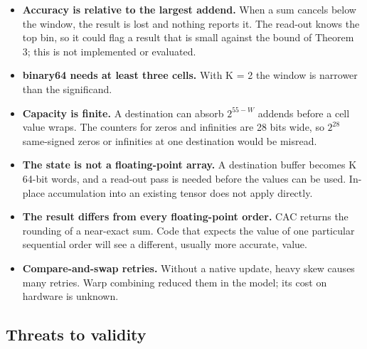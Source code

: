 \documentclass[journal]{IEEEtran}
\begin{document}
\begin{itemize}
\item
  \textbf{Accuracy is relative to the largest addend.} When a sum
  cancels below the window, the result is lost and nothing reports it.
  The read-out knows the top bin, so it could flag a result that is
  small against the bound of Theorem 3; this is not implemented or
  evaluated.
\item
  \textbf{binary64 needs at least three cells.} With K = 2 the window is
  narrower than the significand.
\item
  \textbf{Capacity is finite.} A destination can absorb \(2^{55−W}\)
  addends before a cell value wraps. The counters for zeros and
  infinities are 28 bits wide, so \(2^{28}\) same-signed zeros or
  infinities at one destination would be misread.
\item
  \textbf{The state is not a floating-point array.} A destination buffer
  becomes K 64-bit words, and a read-out pass is needed before the
  values can be used. In-place accumulation into an existing tensor does
  not apply directly.
\item
  \textbf{The result differs from every floating-point order.} CAC
  returns the rounding of a near-exact sum. Code that expects the value
  of one particular sequential order will see a different, usually more
  accurate, value.
\item
  \textbf{Compare-and-swap retries.} Without a native update, heavy skew
  causes many retries. Warp combining reduced them in the model; its
  cost on hardware is unknown.
\end{itemize}

\hypertarget{threats-to-validity}{%
\subsection{Threats to validity}\label{threats-to-validity}}
\end{document}
